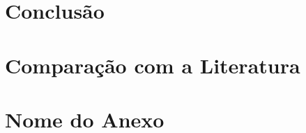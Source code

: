 \documentclass[openright]{normas-utf-tex} %
\begin{document}
%
%



%
%



%
%



%
%
\chapter{Conclusão}\label{chap:conclusao}
















\apendice
\chapter{Comparação com a Literatura}



\anexo
\chapter{Nome do Anexo}




\clearpage


\end{document}
